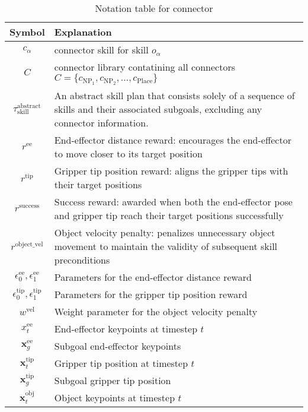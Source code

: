\begin{table}[h!]
\large
\centering
\begin{adjustbox}{width=\columnwidth} %
\begin{tabular}{|c|p{}|} %
\hline
\textbf{Symbol} & \textbf{Explanation} \\ \hline

$c_\alpha$ & connector skill for skill $o_\alpha$ \\ \hline
$C$ & connector library contatining all connectors $C = \{c_{\text{NP}_1}, c_{\text{NP}_2}, \dots, c_{\text{Place}}\}$ \\ \hline
$\tau_{\text{skill}}^\text{abstract}$ & An abstract skill plan that consists solely of a sequence of skills and their associated subgoals, excluding any connector information. \\ \hline
$r^{\text{ee}}$ & End-effector distance reward: encourages the end-effector to move closer to its target position \\ \hline
$r^{\text{tip}}$ & Gripper tip position reward: aligns the gripper tips with their target positions \\ \hline
$r^{\text{success}}$ & Success reward: awarded when both the end-effector pose and gripper tip reach their target positions successfully \\ \hline
$r^{\text{object\_vel}}$ & Object velocity penalty: penalizes unnecessary object movement to maintain the validity of subsequent skill preconditions \\ \hline
$\epsilon^{\text{ee}}_0, \epsilon^{\text{ee}}_1$ & Parameters for the end-effector distance reward \\ \hline
$\epsilon^{\text{tip}}_0, \epsilon^{\text{tip}}_1$ & Parameters for the gripper tip position reward \\ \hline
$w^{\text{vel}}$ & Weight parameter for the object velocity penalty \\ \hline
$x_t^{\text{ee}}$ & End-effector keypoints at timestep $t$ \\ \hline
$\mathbf{x}_g^{\text{ee}}$ & Subgoal end-effector keypoints \\ \hline
$\mathbf{x}_t^{\text{tip}}$ & Gripper tip position at timestep $t$ \\ \hline
$\mathbf{x}_g^{\text{tip}}$ & Subgoal gripper tip position \\ \hline
$\mathbf{x}_t^{\text{obj}}$ & Object keypoints at timestep $t$ \\ \hline

\end{tabular}
\end{adjustbox}
\caption{Notation table for connector}
\label{tab:connector_notation}
\end{table}
